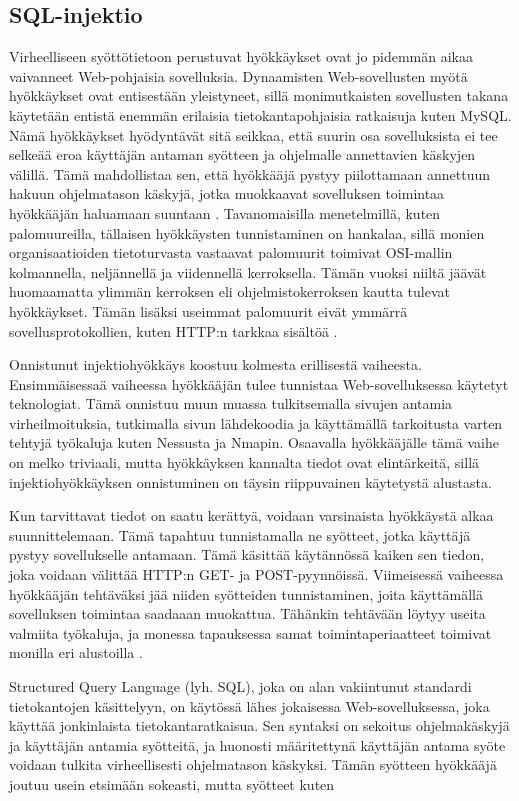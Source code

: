 \subsection{SQL-injektio}

Virheelliseen syöttötietoon perustuvat hyökkäykset ovat jo pidemmän aikaa vaivanneet Web-pohjaisia sovelluksia.
Dynaamisten Web-sovellusten myötä hyökkäykset ovat entisestään yleistyneet, sillä monimutkaisten sovellusten takana käytetään entistä
enemmän erilaisia tietokantapohjaisia ratkaisuja kuten MySQL. Nämä hyökkäykset hyödyntävät sitä seikkaa, että suurin osa
sovelluksista ei tee selkeää eroa käyttäjän antaman syötteen ja ohjelmalle annettavien käskyjen välillä. Tämä mahdollistaa
sen, että hyökkääjä pystyy piilottamaan annettuun hakuun ohjelmatason käskyjä, jotka muokkaavat sovelluksen toimintaa
hyökkääjän haluamaan suuntaan \cite{WEB2}. Tavanomaisilla
menetelmillä, kuten palomuureilla, tällaisen hyökkäysten tunnistaminen on hankalaa, sillä
monien organisaatioiden tietoturvasta vastaavat palomuurit toimivat OSI-mallin
kolmannella, neljännellä ja viidennellä kerroksella. Tämän vuoksi
niiltä jäävät huomaamatta ylimmän kerroksen eli ohjelmistokerroksen
kautta tulevat hyökkäykset. Tämän lisäksi useimmat palomuurit eivät
ymmärrä sovellusprotokollien,
kuten HTTP:n tarkkaa sisältöä \cite{SQLSS}.    

Onnistunut injektiohyökkäys koostuu kolmesta erillisestä vaiheesta. Ensimmäisessaä vaiheessa hyökkääjän tulee tunnistaa 
Web-sovelluksessa käytetyt teknologiat. Tämä onnistuu muun muassa tulkitsemalla sivujen antamia virheilmoituksia, tutkimalla 
sivun lähdekoodia ja käyttämällä tarkoitusta varten tehtyjä työkaluja kuten Nessusta ja Nmapin. Osaavalla hyökkääjälle tämä vaihe on melko triviaali, 
mutta hyökkäyksen kannalta tiedot ovat elintärkeitä, sillä injektiohyökkäyksen onnistuminen on täysin riippuvainen 
käytetystä alustasta.

Kun tarvittavat tiedot on saatu kerättyä, voidaan varsinaista hyökkäystä alkaa suunnittelemaan.
Tämä tapahtuu tunnistamalla ne syötteet, jotka käyttäjä pystyy sovellukselle antamaan. Tämä käsittää käytännössä kaiken sen 
tiedon, joka voidaan välittää HTTP:n GET- ja POST-pyynnöissä. Viimeisessä vaiheessa hyökkääjän tehtäväksi jää niiden syötteiden 
tunnistaminen, joita käyttämällä sovelluksen toimintaa saadaaan muokattua. Tähänkin tehtävään löytyy useita valmiita työkaluja, ja
monessa tapauksessa samat toimintaperiaatteet toimivat monilla eri alustoilla \cite{WEB2}.

Structured Query Language (lyh. SQL), joka on alan vakiintunut standardi tietokantojen käsittelyyn, on käytössä lähes jokaisessa
Web-\-sovelluksessa, joka käyttää jonkinlaista tietokantaratkaisua. Sen syntaksi on sekoitus ohjelmakäskyjä ja käyttäjän antamia
syötteitä, ja huonosti määritettynä käyttäjän antama syöte voidaan tulkita virheellisesti ohjelmatason käskyksi. Tämän syötteen
hyökkääjä joutuu usein etsimään sokeasti, mutta syötteet kuten

